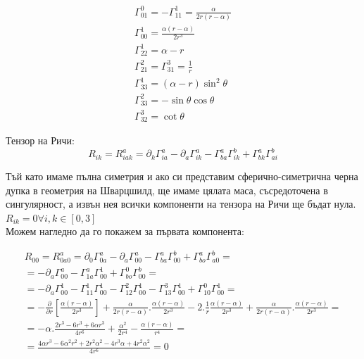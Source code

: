 \documentclass[a4paper,12pt]{article}
\begin{document}
    \begin{equation*}
        \begin{aligned}
        \varGamma^0_{01} = - \varGamma^1_{11} = \frac{\alpha}{2r(r-\alpha)} \\ 
        \varGamma^1_{00} = \frac{\alpha(r-\alpha)}{2r^3} \\ 
        \varGamma^1_{22} = \alpha - r \\
        \varGamma^2_{21} = \varGamma^3_{31} = \frac{1}{r} \\
        \varGamma^1_{33} = (\alpha - r)\sin^2\theta \\
        \varGamma^2_{33} = - \sin\theta\cos\theta \\
        \varGamma^3_{32} = \cot\theta
    \end{aligned}
    \end{equation*}

    Тензор на Ричи:
    \begin{equation*}
        R_{ik} = R^a_{iak} = \partial_k\varGamma^a_{ia} - \partial_a\varGamma^a_{ik}-\varGamma^a_{ba}\varGamma^b_{ik} + \varGamma^a_{bk}\varGamma^b_{ai}
    \end{equation*}

    Тъй като имаме пълна симетрия и ако си представим
    сферично-симетрична черна дупка в геометрия на Шварцшилд, ще имаме 
    цялата маса, съсредоточена в сингулярност, а извън нея всички компоненти на тензора на 
    Ричи ще бъдат нула.\\

    $R_{ik}=0 \forall i, k \in [0, 3]$\\

    Можем нагледно да го покажем за първата компонента:

    \begin{equation*}
        \begin{aligned}
            R_{00}=R^a_{0a0} = \partial_0\varGamma^a_{0a} - \partial_a\varGamma^a_{00}-\varGamma^a_{ba}\varGamma^b_{00}+\varGamma^a_{bo}\varGamma^b_{a0}=\\
            = - \partial_a\varGamma^a_{00} - \varGamma^a_{1a}\varGamma^1_{00}+\varGamma^0_{bo}\varGamma^b_{00} =\\
            = -\partial_a\varGamma^1_{00}-\varGamma^1_{11}\varGamma^1_{00}-\varGamma^2_{12}\varGamma^1_{00}-\varGamma^3_{13}\varGamma^1_{00}+\varGamma^0_{10}\varGamma^1_{00} = \\
            =- \frac{\partial}{\partial r}\left[ \frac{\alpha(r-\alpha)}{2r^3} \right] + \frac{\alpha}{2r(r-\alpha)}.\frac{\alpha(r-\alpha)}{2r^3}-2.\frac{1}{r}\frac{\alpha(r-\alpha)}{2r^3}
            + \frac{\alpha}{2r(r-\alpha)}.\frac{\alpha(r-\alpha)}{2r^3} = \\
            = -\alpha.\frac{2r^3 - 6r^3+6\alpha r^3}{4r^6} + \frac{\alpha^2}{2r^4} - \frac{\alpha(r-\alpha)}{r^4} = \\
            = \frac{4\alpha r^3 - 6 \alpha^2 r^2 + 2r^2\alpha^2-4r^3\alpha+4r^2\alpha^2}{4r^6} = 0
        \end{aligned}
    \end{equation*}
\end{document}
